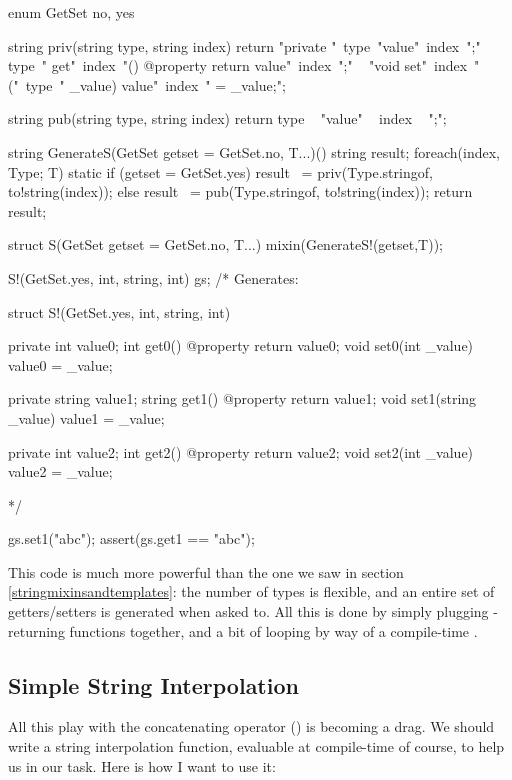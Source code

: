 \begin{dcode}
enum GetSet { no, yes}

string priv(string type, string index)
{
    return 
    "private "~type~"value"~index~";\n"
  ~ type~" get"~index~"() @property { return value"~index~";}\n"
  ~ "void set"~index~"("~type~" _value) { value"~index~" = _value;}";
}   

string pub(string type, string index)
{
    return type ~ "value" ~ index ~ ";";
}

string GenerateS(GetSet getset = GetSet.no, T...)()
{
    string result;    
    foreach(index, Type; T)
        static if (getset = GetSet.yes)
		     result ~= priv(Type.stringof, to!string(index));
        else
            result ~= pub(Type.stringof, to!string(index));
    return result;
}

struct S(GetSet getset = GetSet.no, T...)
{
    mixin(GenerateS!(getset,T));
}

S!(GetSet.yes, int, string, int) gs;
/* Generates:

struct S!(GetSet.yes, int, string, int)
{
    private int value0;
    int get0() @property { return value0;}
    void set0(int _value) { value0 = _value;}

    private string value1;
    string get1() @property { return value1;}
    void set1(string _value) { value1 = _value;}

    private int value2;
    int get2() @property { return value2;}
    void set2(int _value) { value2 = _value;}
}
*/

gs.set1("abc");
assert(gs.get1 == "abc");
\end{dcode}

This code is much more powerful than the one we saw in section \ref{stringmixinsandtemplates}: the number of types is flexible, and an entire set of getters/setters is generated when asked to. All this is done by simply plugging -returning functions together, and a bit of looping by way of a compile-time .

\subsection{Simple String Interpolation}\label{stringinterpolation}

All this play with the concatenating operator (\DD{\~}) is becoming a drag. We should write a string interpolation function, evaluable at compile-time of course, to help us in our task. Here is how I want to use it:

